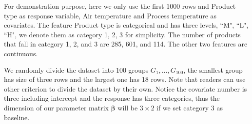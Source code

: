 \documentclass[12pt]{article}
\newcommand{\betavec}{{\boldsymbol{\beta}}}
\begin{document}
For demonstration purpose, here we only use the first 1000 rows and Product type as response variable, Air temperature and Process temperature as covariates. The feature Product type is categorical and has three levels, ``M", ``L", ``H", we denote them as category 1, 2, 3 for simplicity. The number of products that fall in category 1, 2, and 3 are 285, 601, and 114. The other two features are continuous.


We randomly divide the dataset into 100 groups $G_1,\dots,G_{100}$, the smallest group has size of three rows and the largest one has 18 rows. Note that readers can use other criterion to divide the dataset by their own. Notice the covariate number is three including intercept and the response has three categories, thus the dimension of our parameter matrix $\betavec$ will be $3 \times 2$ if we set category 3 as baseline.
\end{document}
